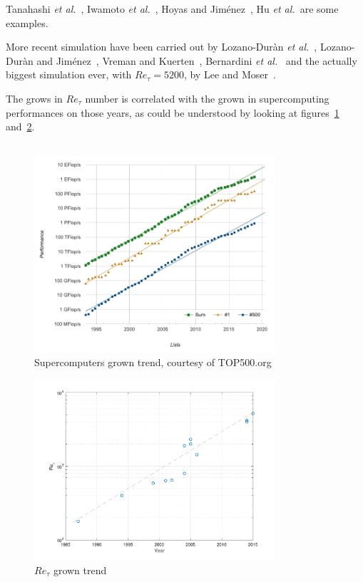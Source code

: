 Tanahashi \emph{et al.}~\cite{Tanahashi}, Iwamoto \emph{et al.}~\cite{Iwamoto2}, Hoyas and Jiménez~\cite{Hoyas}, Hu \emph{et al.}~\cite{Hu}are some examples. \par
More recent simulation have been carried out by Lozano-Duràn \emph{et al.}~\cite{Lozano}, Lozano-Duràn and Jiménez~\cite{Lozano2}, Vreman and Kuerten~\cite{Vreman}, Bernardini \emph{et al.}~\cite{Bernardini} and the actually biggest simulation ever, with $Re_{\tau}=5200$, by Lee and Moser~\cite{Lee}. \par
The grows in $Re_{\tau}$ number is correlated with the grown in supercomputing performances on those years, as could be understood by looking at figures~\ref{top500} and~\ref{dns:trend}.\\~\par

\begin{figure}
\begin{center}
\includegraphics[width=0.8\textwidth]{grafici/top500hist}
\caption{Supercomputers grown trend, courtesy of TOP500.org}
\label{top500}
\end{center}
\end{figure}
\begin{figure}
\begin{center}
\includegraphics[width=0.8\textwidth]{grafici/dns_trend}
\caption{$Re_{\tau}$ grown trend}
\label{dns:trend}
\end{center}
\end{figure}



